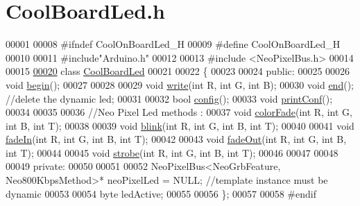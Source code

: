 \hypertarget{_cool_board_led_8h_source}{}\section{Cool\+Board\+Led.\+h}

\begin{DoxyCode}
00001 
00008 \textcolor{preprocessor}{#ifndef CoolOnBoardLed\_H}
00009 \textcolor{preprocessor}{#define CoolOnBoardLed\_H}
00010 
00011 \textcolor{preprocessor}{#include"Arduino.h"}
00012 
00013 \textcolor{preprocessor}{#include <NeoPixelBus.h>}
00014 
00015 
\hyperlink{class_cool_board_led}{00020} \textcolor{keyword}{class }\hyperlink{class_cool_board_led}{CoolBoardLed}
00021 
00022 \{
00023 
00024 \textcolor{keyword}{public}:
00025 
00026     \textcolor{keywordtype}{void} \hyperlink{class_cool_board_led_ae3cbde8affcc6f011cbd698c8ef911f6}{begin}();           
00027 
00028 
00029     \textcolor{keywordtype}{void} \hyperlink{class_cool_board_led_a30fadd4cbec17ceea428bf7a32207e87}{write}(\textcolor{keywordtype}{int} R, \textcolor{keywordtype}{int} G, \textcolor{keywordtype}{int} B);       
00030     \textcolor{keywordtype}{void} \hyperlink{class_cool_board_led_a69f323359e0c9f797422f2152b5d41ef}{end}();              \textcolor{comment}{//delete the dynamic led;}
00031 
00032     \textcolor{keywordtype}{bool} \hyperlink{class_cool_board_led_a1b60e5e30bea96c49ed62ed1bf1ffc8b}{config}();
00033     \textcolor{keywordtype}{void} \hyperlink{class_cool_board_led_a8ed3053a36f0ed4a131f43b5b17efb61}{printConf}();
00034 
00035 
00036     \textcolor{comment}{//Neo Pixel Led methods :}
00037     \textcolor{keywordtype}{void} \hyperlink{class_cool_board_led_a6dbfe23988f43e1242cd05e69b13ff30}{colorFade}(\textcolor{keywordtype}{int} R, \textcolor{keywordtype}{int} G, \textcolor{keywordtype}{int} B, \textcolor{keywordtype}{int} T);
00038 
00039     \textcolor{keywordtype}{void} \hyperlink{class_cool_board_led_a27706bc029f6a126c55d0b91624ad7fa}{blink}(\textcolor{keywordtype}{int} R, \textcolor{keywordtype}{int} G, \textcolor{keywordtype}{int} B, \textcolor{keywordtype}{int} T);
00040 
00041     \textcolor{keywordtype}{void} \hyperlink{class_cool_board_led_aec915442a8441c7cd45c3279d3ff8821}{fadeIn}(\textcolor{keywordtype}{int} R, \textcolor{keywordtype}{int} G, \textcolor{keywordtype}{int} B, \textcolor{keywordtype}{int} T);
00042 
00043     \textcolor{keywordtype}{void} \hyperlink{class_cool_board_led_a27c4e14fa2cd3639c0844152cea98887}{fadeOut}(\textcolor{keywordtype}{int} R, \textcolor{keywordtype}{int} G, \textcolor{keywordtype}{int} B, \textcolor{keywordtype}{int} T);
00044 
00045     \textcolor{keywordtype}{void} \hyperlink{class_cool_board_led_adc08c0ac07473499971c503d300f0413}{strobe}(\textcolor{keywordtype}{int} R, \textcolor{keywordtype}{int} G, \textcolor{keywordtype}{int} B, \textcolor{keywordtype}{int} T); 
00046 
00047 
00048 
00049 \textcolor{keyword}{private}:
00050 
00051 
00052     NeoPixelBus<NeoGrbFeature, Neo800KbpsMethod>* neoPixelLed = NULL; \textcolor{comment}{//template instance must be dynamic}
00053 
00054     byte ledActive;
00055 
00056 \};
00057 
00058 \textcolor{preprocessor}{#endif}
\end{DoxyCode}
